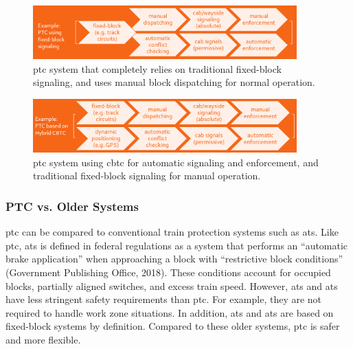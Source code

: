 \documentclass[11pt, titlepage]{article}
\begin{document}
\begin{figure}[ht]
    \begin{center}
        \includegraphics[width=4in]{FixedBlockPTC.png}
        \captionsetup{justification=centering}
        \caption[PTC with Fixed-Block Signaling]{\gls{ptc} system that completely
        relies on traditional fixed-block signaling, and uses manual block dispatching
        for normal operation.}
    \end{center}
\end{figure}

\begin{figure}[ht]
    \begin{center}
        \includegraphics[width=4in]{PTCHybridCBTC.png}
        \captionsetup{justification=centering}
        \caption[PTC with Hybrid CBTC]{\gls{ptc} system using \gls{cbtc} for automatic
        signaling and enforcement, and traditional fixed-block signaling for manual
        operation.}
        \label{PTCHybridCBTC}
    \end{center}
\end{figure}

\subsubsection{PTC vs. Older Systems}

\gls{ptc} can be compared to conventional train protection systems such as
\gls{ats}. Like \gls{ptc}, \gls{ats} is defined in federal regulations
as a system that performs an ``automatic brake application'' when approaching a
block with ``restrictive block conditions'' (Government Publishing Office, 2018).
These conditions account for occupied blocks, partially
aligned switches, and excess train speed. However, \gls{ats} and \gls{ats} have
less stringent safety requirements than \gls{ptc}. For example, they are not
required to handle work zone situations. In addition, \gls{ats} and \gls{ats} are
based on fixed-block systems by definition. Compared to these older systems,
\gls{ptc} is safer and more flexible.
\end{document}
